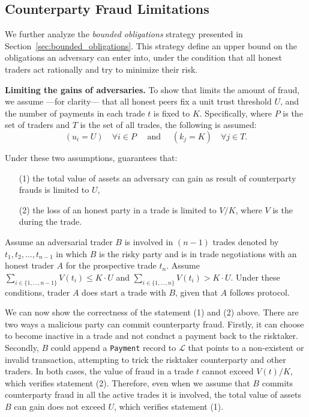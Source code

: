 \subsection{Counterparty Fraud Limitations}
We further analyze the \emph{bounded obligations} strategy presented in Section~\ref{sec:bounded_obligations}.
This strategy define an upper bound on the obligations an adversary can enter into, under the condition that all honest traders act rationally and try to minimize their risk.

\textbf{Limiting the gains of adversaries.} 
To show that \ModelName{} limits the amount of fraud, we assume  ---for clarity--- that all honest peers fix a unit trust threshold $ U $, and the number of payments in each trade $ t $ is fixed to $ K $. 
Specifically, where $ P $ is the set of traders and $ T $ is the set of all trades, the following is assumed:
\begin{equation*}
	(u_i = U) \quad\forall i\in P \quad\text{ and }\quad (k_j = K) \quad\forall j \in T.
\end{equation*}

Under these two assumptions, \ModelName{} guarantees that:

\begin{itemize}
	\item[(1)] the total value of assets an adversary can gain as result of counterparty frauds is limited to $ U $,
	\item[(2)] the loss of an honest party in a trade is limited to $ V/K $, where $ V $ is the \MarginalStake{} during the trade.
\end{itemize}

Assume an adversarial trader $ B $ is involved in $ (n-1) $ trades denoted by $ t_1, t_2, \ldots, t_{n-1} $ in which $ B $ is the risky party and is in trade negotiations with an honest trader $ A $ for the prospective trade $ t_n $.
Assume $\sum_{i \in \{1, \ldots, n-1\}} V(t_i) \leq K\cdotp U$ and $\sum_{i \in \{1, \ldots, n\}} V(t_i) > K\cdotp U$.
Under these conditions, trader $ A $ does start a trade with $ B $, given that $ A $ follows \ModelName{} protocol.

We can now show the correctness of the statement (1) and (2) above.
There are two ways a malicious party can commit counterparty fraud.
Firstly, it can choose to become inactive in a trade and not conduct a payment back to the risktaker.
Secondly, $ B $ could append a \texttt{Payment} record to $ \mathcal{L} $ that points to a non-existent or invalid transaction, attempting to trick the risktaker counterparty and other traders.
In both cases, the value of fraud in a trade $ t $ cannot exceed $ V(t)/K $, which verifies statement (2).
Therefore, even when we assume that $ B $ commits counterparty fraud in all the active trades it is involved, the total value of assets $ B $ can gain does not exceed $ U $, which verifies statement (1). 

